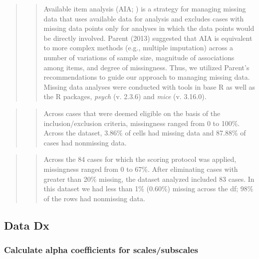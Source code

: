 \documentclass[
  11pt,
]{book}
\begin{document}
\begin{quote}
\begin{quote}
Available item analysis (AIA; \citep{parent_handling_2013}) is a strategy for managing missing data that uses available data for analysis and excludes cases with missing data points only for analyses in which the data points would be directly involved. Parent (2013) suggested that AIA is equivalent to more complex methods (e.g., multiple imputation) across a number of variations of sample size, magnitude of associations among items, and degree of missingness. Thus, we utilized Parent's recommendations to guide our approach to managing missing data. Missing data analyses were conducted with tools in base R as well as the R packages, \emph{psych} (v. 2.3.6) and \emph{mice} (v. 3.16.0).
\end{quote}
\end{quote}

\begin{quote}
\begin{quote}
Across cases that were deemed eligible on the basis of the inclusion/exclusion criteria, missingness ranged from 0 to 100\%. Across the dataset, 3.86\% of cells had missing data and 87.88\% of cases had nonmissing data.
\end{quote}
\end{quote}

\begin{quote}
\begin{quote}
Across the 84 cases for which the scoring protocol was applied, missingness ranged from 0 to 67\%. After eliminating cases with greater than 20\% missing, the dataset analyzed included 83 cases. In this dataset we had less than 1\% (0.60\%) missing across the df; 98\% of the rows had nonmissing data.
\end{quote}
\end{quote}

\hypertarget{data-dx}{%
\subsection{Data Dx}\label{data-dx}}

\hypertarget{calculate-alpha-coefficients-for-scalessubscales}{%
\subsubsection*{Calculate alpha coefficients for scales/subscales}\label{calculate-alpha-coefficients-for-scalessubscales}}
\end{document}
